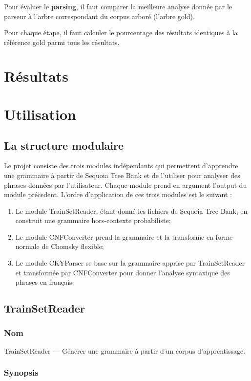 \documentclass[12pt]{article}
\begin{document}
Pour évaluer le \textbf{parsing}, il faut comparer la meilleure analyse donnée
par le parseur à l'arbre correspondant du corpus arboré (l'arbre gold).

Pour chaque étape, il faut calculer le pourcentage des résultats identiques à
la référence gold parmi tous les résultats.


\section{R\'esultats}

\section{Utilisation}
\subsection{La structure modulaire}
Le projet consiste des trois modules indépendants qui permettent d'apprendre une
grammaire à partir de Sequoia Tree Bank \cite{Sequoia} et de l'utiliser pour
analyser des phrases données par l'utilisateur. Chaque module prend en
argument l'output du module précedent. L'ordre d'application de ces trois
modules est le suivant :
\begin{enumerate}
  \item Le module TrainSetReader, étant donné les fichiers de Sequoia Tree Bank,
  en construit une grammaire hors-contexte probabiliste;
  \item Le module CNFConverter prend la grammaire et la transforme en forme
  normale de Chomsky flexible;
  \item Le module CKYParser se base sur la grammaire apprise par TrainSetReader
  et transformée par CNFConverter pour donner l'analyse syntaxique des phrases
  en français.
\end{enumerate}

\subsection{TrainSetReader}
\subsubsection{Nom}
 
TrainSetReader --- Générer une grammaire à partir d'un corpus d'apprentissage.
 
\subsubsection{Synopsis}
 
\end{document}

